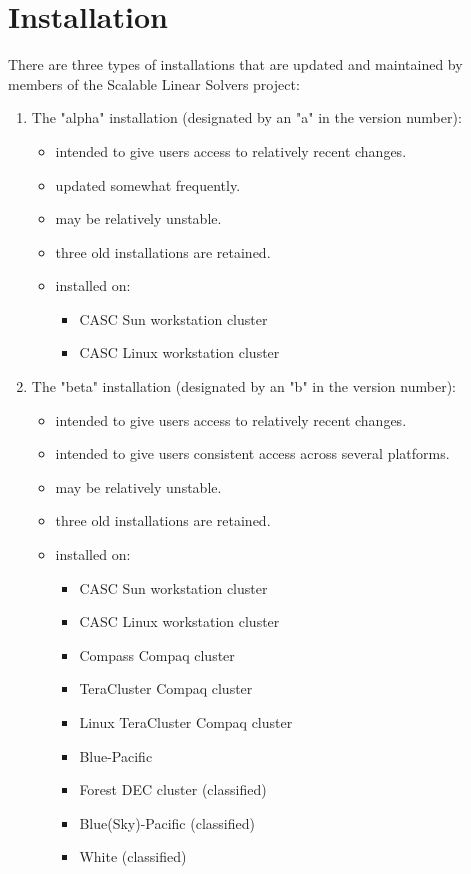 \chapter{Installation}
\label{Installation}

There are three types of \hypre{} installations that are updated and
maintained by members of the Scalable Linear Solvers project:
\begin{enumerate}

\item The "alpha" installation (designated by an "a" in the version number):
   \begin{itemize}
   \item intended to give users access to relatively recent changes.
   \item updated somewhat frequently.
   \item may be relatively unstable.
   \item three old installations are retained.
   \item installed on:
      \begin{itemize}
      \item CASC Sun workstation cluster
      \item CASC Linux workstation cluster
      \end{itemize}
   \end{itemize}

\item The "beta" installation (designated by an "b" in the version number):
   \begin{itemize}
   \item intended to give users access to relatively recent changes.
   \item intended to give users consistent access across several platforms.
   \item may be relatively unstable.
   \item three old installations are retained.
   \item installed on:
      \begin{itemize}
       \item CASC Sun workstation cluster
       \item CASC Linux workstation cluster
       \item Compass Compaq cluster
       \item TeraCluster Compaq cluster
       \item Linux TeraCluster Compaq cluster
       \item Blue-Pacific
       \item Forest DEC cluster  (classified)
       \item Blue(Sky)-Pacific   (classified)
       \item White               (classified)
      \end{itemize}
   \end{itemize}


\end{enumerate}
